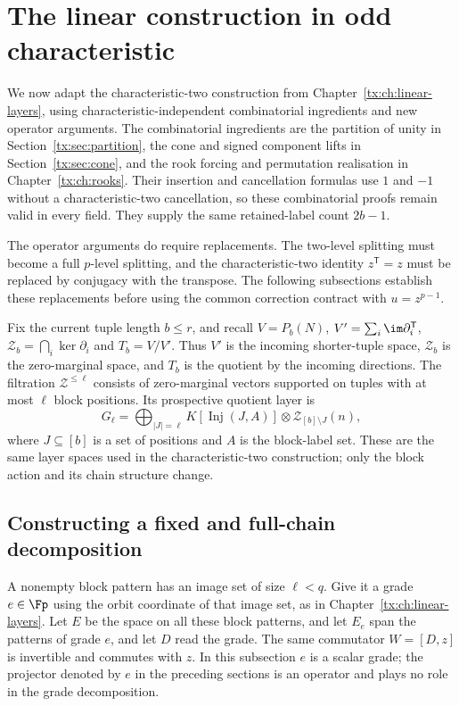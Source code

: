 \documentclass[11pt,a4paper,oneside,openany]{book}
\theoremstyle{definition}\newtheorem{definition}[theorem]{Definition}
\theoremstyle{remark}\newtheorem{remark}[theorem]{Remark}
\DeclareMathOperator{\Inj}{Inj}
\numberwithin{equation}{chapter}
\begin{document}
\section{The linear construction in odd characteristic}\label{tx:sec:oddlinear}
We now adapt the characteristic-two construction from
Chapter~\ref{tx:ch:linear-layers}, using characteristic-independent
combinatorial ingredients and new operator arguments. The combinatorial
ingredients are the partition of unity in Section~\ref{tx:sec:partition}, the cone
and signed component lifts in Section~\ref{tx:sec:cone}, and the
rook forcing and permutation realisation in
Chapter~\ref{tx:ch:rooks}. Their insertion and cancellation formulas
use $1$ and $-1$ without a characteristic-two cancellation, so these
combinatorial proofs remain valid in every field. They supply
the same retained-label count $2b-1$.

The operator arguments do require replacements. The two-level
splitting must become a full $p$-level splitting, and the
characteristic-two identity $z^{\mathsf T}=z$ must be replaced by
conjugacy with the transpose. The following subsections establish
these replacements before using the common correction contract
with $u=z^{p-1}$.

Fix the current tuple length $b\le r$, and recall
$V=P_b(N)$, $V'=\sum_i\im\partial_i^{\mathsf T}$,
$\mathcal Z_b=\bigcap_i\ker\partial_i$ and $T_b=V/V'$.
Thus $V'$ is the incoming shorter-tuple space, $\mathcal Z_b$ is
the zero-marginal space, and $T_b$ is the quotient by the incoming
directions. The filtration $\mathcal Z^{\le\ell}$ consists of
zero-marginal vectors supported on tuples with at most $\ell$ block
positions. Its prospective quotient layer
is
\[
G_\ell=\bigoplus_{|J|=\ell}
       K[\Inj(J,A)]\otimes\mathcal Z_{[b]\setminus J}(n),
\]
where $J\subseteq[b]$ is a set of positions and $A$ is the block-label set.
These are the same layer spaces used in the characteristic-two
construction; only the block action and its chain structure change.

\subsection{Constructing a fixed and full-chain decomposition}
A nonempty block pattern has an image set of size $\ell<q$.
Give it a grade $e\in\Fp$ using the orbit coordinate of that image
set, as in Chapter~\ref{tx:ch:linear-layers}. Let $E$ be the space on
all these block patterns, and let $E_e$ span the
patterns of grade $e$, and let $D$ read the grade. The same commutator
$W=[D,z]$ is invertible and commutes with $z$.
In this subsection $e$ is a scalar grade; the projector denoted by
$e$ in the preceding sections is an operator and plays no role in
the grade decomposition.
\end{document}
